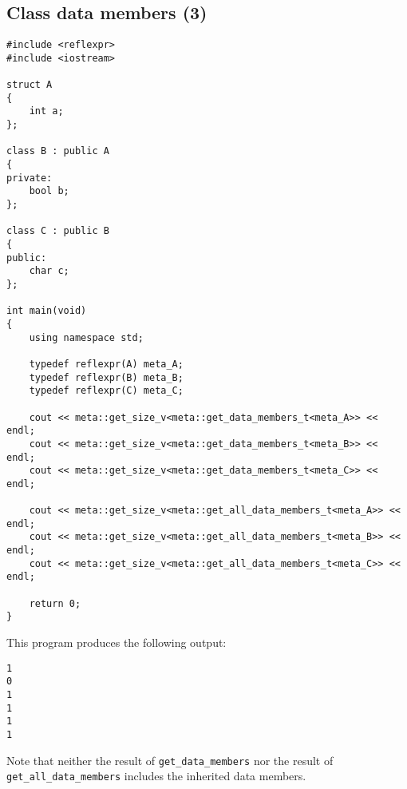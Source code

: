 \subsection{Class data members (3)}

\begin{verbatim}
#include <reflexpr>
#include <iostream>

struct A
{
	int a;
};

class B : public A
{
private:
	bool b;
};

class C : public B
{
public:
	char c;
};

int main(void)
{
	using namespace std;

	typedef reflexpr(A) meta_A;
	typedef reflexpr(B) meta_B;
	typedef reflexpr(C) meta_C;

	cout << meta::get_size_v<meta::get_data_members_t<meta_A>> << endl;
	cout << meta::get_size_v<meta::get_data_members_t<meta_B>> << endl;
	cout << meta::get_size_v<meta::get_data_members_t<meta_C>> << endl;

	cout << meta::get_size_v<meta::get_all_data_members_t<meta_A>> << endl;
	cout << meta::get_size_v<meta::get_all_data_members_t<meta_B>> << endl;
	cout << meta::get_size_v<meta::get_all_data_members_t<meta_C>> << endl;

	return 0;
}
\end{verbatim}

This program produces the following output:

\begin{verbatim}
1
0
1
1
1
1
\end{verbatim}

Note that neither the result of \texttt{get\_data\_members} nor the result of
\texttt{get\_all\_data\_members} includes the inherited data members.
